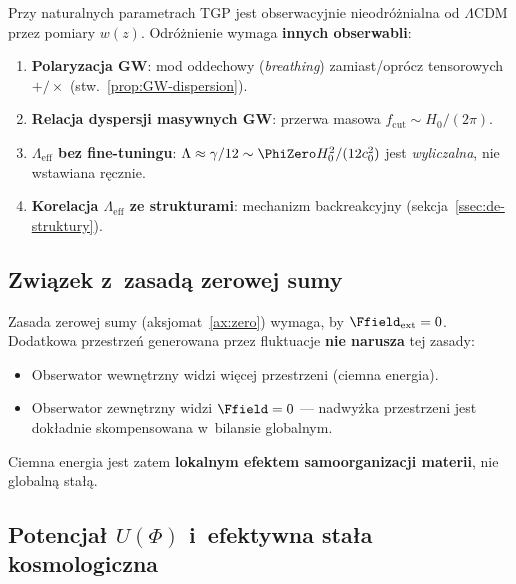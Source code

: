 \begin{remark}\label{rem:rozroznienie}
Przy naturalnych parametrach TGP jest obserwacyjnie
nieodr\'o\.znialna od $\Lambda$CDM przez pomiary $w(z)$.
Odr\'o\.znienie wymaga \textbf{innych obserwabli}:
\begin{enumerate}[nosep]
  \item \textbf{Polaryzacja GW}: mod oddechowy (\emph{breathing})
        zamiast/opr\'ocz tensorowych $+/\times$
        (stw.~\ref{prop:GW-dispersion}).
  \item \textbf{Relacja dyspersji masywnych GW}:
        przerwa masowa $f_{\mathrm{cut}} \sim H_0/(2\pi)$.
  \item \textbf{$\Lambda_{\mathrm{eff}}$ bez fine-tuningu}:
        $\Lambda \approx \gamma/12 \sim \PhiZero H_0^2/(12 c_0^2)$
        jest \emph{wyliczalna}, nie wstawiana r\k{e}cznie.
  \item \textbf{Korelacja $\Lambda_{\mathrm{eff}}$
        ze strukturami}: mechanizm backreakcyjny
        (sekcja~\ref{ssec:de-struktury}).
\end{enumerate}
\end{remark}

\subsection{Zwi\k{a}zek z~zasad\k{a} zerowej sumy}\label{ssec:de-zero}

Zasada zerowej sumy (aksjomat~\ref{ax:zero}) wymaga, by
$\Ffield_{\mathrm{ext}} = 0$. Dodatkowa przestrze\'n
generowana przez fluktuacje \textbf{nie narusza} tej zasady:
\begin{itemize}[nosep]
  \item Obserwator wewn\k{e}trzny widzi wi\k{e}cej przestrzeni
        (ciemna energia).
  \item Obserwator zewn\k{e}trzny widzi $\Ffield = 0$ ---
        nadwy\.zka przestrzeni jest dok\l{}adnie skompensowana
        w~bilansie globalnym.
\end{itemize}

Ciemna energia jest zatem \textbf{lokalnym efektem
samoorganizacji materii}, nie globaln\k{a} sta\l{}\k{a}.

\subsection{Potencja\l{} $U(\Phi)$ i~efektywna sta\l{}a kosmologiczna}\label{ssec:de-potencjal}

